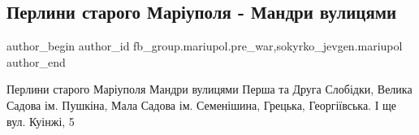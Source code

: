  
 
 
 
 

\subsection{Перлини старого Маріуполя - Мандри вулицями}
\label{sec:05_03_2023.fb.fb_group.mariupol.pre_war.3.perlini_starogo_mar_}
 
\ifcmt
 author_begin
   author_id fb_group.mariupol.pre_war,sokyrko_jevgen.mariupol
 author_end
\fi

Перлини старого Маріуполя Мандри вулицями Перша та Друга Слобідки, Велика
Садова ім. Пушкіна, Мала Садова ім. Семенішина, Грецька, Георгіївська. І ще
вул. Куінжі, 5




